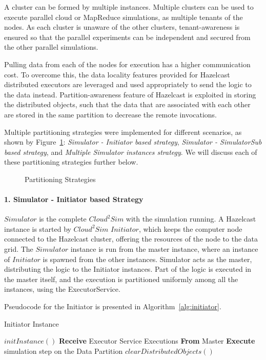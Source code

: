 A cluster can be formed by multiple instances. Multiple clusters can be used to execute parallel cloud or MapReduce simulations, as multiple tenants of the nodes. As each cluster is unaware of the other clusters, tenant-awareness is ensured so that the parallel experiments can be independent and secured from the other parallel simulations.

Pulling data from each of the nodes for execution has a higher communication cost. To overcome this, the data locality features provided for Hazelcast distributed executors are leveraged and used appropriately to send the logic to the data instead. Partition-awareness feature of Hazelcast is exploited in storing the distributed objects, such that the data that are associated with each other are stored in the same partition to decrease the remote invocations. 

Multiple partitioning strategies were implemented for different scenarios, as shown by Figure~\ref{fig:partitionapproaches}: \textit{Simulator - Initiator based strategy}, \textit{Simulator - SimulatorSub based strategy}, and \textit{Multiple Simulator instances strategy}. We will discuss each of these partitioning strategies further below.
\begin{figure}[!htbp]
\begin{center}
\end{center}
 \caption{Partitioning Strategies}
 \label{fig:partitionapproaches}
\end{figure}

\paragraph*{1. Simulator - Initiator based Strategy}
$Simulator$ is the complete $Cloud^{2}Sim$ with the simulation running. A Hazelcast instance is started by $Cloud^{2}Sim$ $Initiator$, which keeps the computer node connected to the Hazelcast cluster, offering the resources of the node to the data grid. The $Simulator$ instance is run from the master instance, where an instance of $Initiator$ is spawned from the other instances. Simulator acts as the master, distributing the logic to the Initiator instances. Part of the logic is executed in the master itself, and the execution is partitioned uniformly among all the instances, using the ExecutorService.

Pseudocode for the Initiator is presented in Algorithm~\ref{alg:initiator}.
\begin{algorithm}
  \caption{Initiator Instance}
\label{alg:initiator}
  \begin{algorithmic}
\State $initInstance()$
\State \textbf{Receive} Executor Service Executions \textbf{From} Master
\State \textbf{Execute} simulation step on the Data Partition
\EndWhile
\State $clearDistributedObjects()$ 
  \end{algorithmic}
\end{algorithm}

